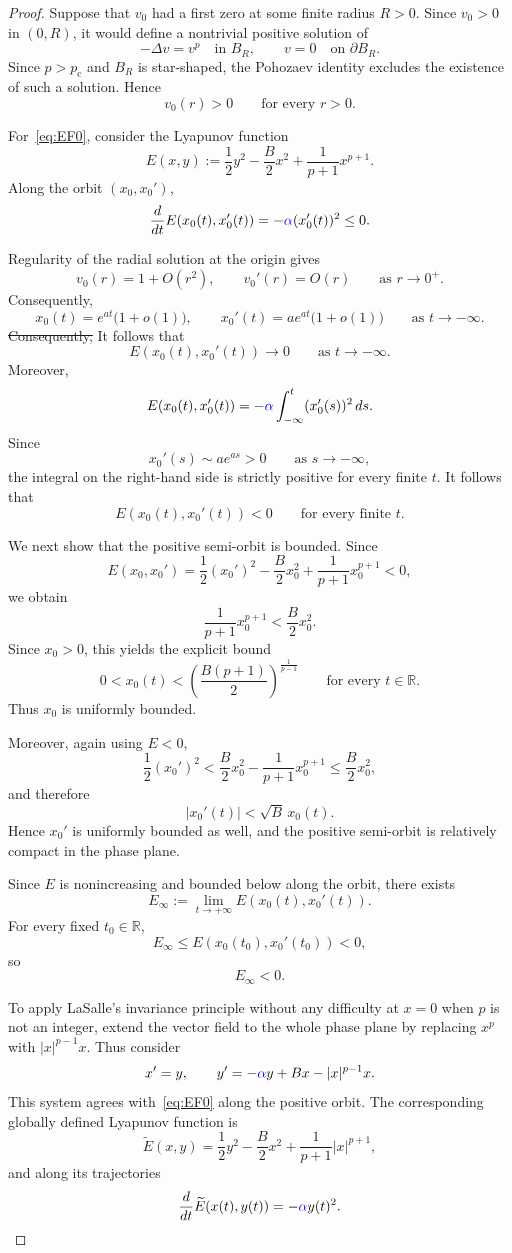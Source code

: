 \documentclass[11pt]{article}
\newcommand{\R}{\mathbb{R}}
\newcommand{\pc}{p_{\mathrm c}}
\newcommand{\add}[1]{{\color{blue}#1}}
\newcommand{\del}[1]{{\color{red}\sout{#1}}}
\newcommand{\oldrev}[1]{#1}
\newcommand{\damp}{\add{\alpha}}            %
\theoremstyle{definition}
\begin{document}
\begin{proof}
Suppose that $v_0$ had a first zero at some finite radius $R>0$.
Since $v_0>0$ in $(0,R)$, it would define a nontrivial positive
solution of
\[
-\Delta v=v^p
\quad\text{in }B_R,
\qquad
v=0
\quad\text{on }\partial B_R.
\]
Since \oldrev{$p>\pc$} and $B_R$ is star-shaped, the Pohozaev
identity excludes the existence of such a solution. Hence
\[
v_0(r)>0
\qquad
\text{for every }r>0.
\]

For~\eqref{eq:EF0}, consider the Lyapunov function
\[
E(x,y)
:=
\frac12y^2
-\frac{B}{2}x^2
+\frac1{p+1}x^{p+1}.
\]
Along the orbit $(x_0,x_0')$,
\[
\frac{d}{dt}E(x_0(t),x_0'(t))
=
-\damp(x_0'(t))^2
\leq0.
\]

\oldrev{Regularity of the radial solution at the origin gives
\[
v_0(r)=1+O(r^2),
\qquad
v_0'(r)=O(r)
\qquad
\text{as }r\to0^+.
\]
Consequently,}
\[
x_0(t)=e^{at}\bigl(1+o(1)\bigr),
\qquad
x_0'(t)=ae^{at}\bigl(1+o(1)\bigr)
\qquad
\text{as }t\to-\infty.
\]
\del{Consequently,} \add{It follows that}
\[
E(x_0(t),x_0'(t))\longrightarrow0
\qquad
\text{as }t\to-\infty.
\]
Moreover,
\[
E(x_0(t),x_0'(t))
=
-\damp\int_{-\infty}^{t}(x_0'(s))^2\,ds.
\]
\oldrev{Since
\[
x_0'(s)\sim ae^{as}>0
\qquad\text{as }s\to-\infty,
\]
the integral on the right-hand side is strictly positive for every
finite $t$.}
It follows that
\[
E(x_0(t),x_0'(t))<0
\qquad
\text{for every finite }t.
\]

We next show that the positive semi-orbit is bounded. Since
\[
E(x_0,x_0')
=
\frac12(x_0')^2
-\frac{B}{2}x_0^2
+\frac1{p+1}x_0^{p+1}
<0,
\]
we obtain
\[
\frac1{p+1}x_0^{p+1}
<
\frac{B}{2}x_0^2.
\]
\oldrev{Since $x_0>0$, this yields the explicit bound
\[
0<x_0(t)
<
\left(\frac{B(p+1)}{2}\right)^{\frac1{p-1}}
\qquad\text{for every }t\in\mathbb R.
\]}
Thus $x_0$ is uniformly bounded.

\oldrev{Moreover, again using $E<0$,
\[
\frac12(x_0')^2
<
\frac{B}{2}x_0^2
-\frac1{p+1}x_0^{p+1}
\leq
\frac{B}{2}x_0^2,
\]
and therefore
\[
|x_0'(t)|<\sqrt{B}\,x_0(t).
\]}
Hence $x_0'$ is uniformly bounded as well, and the positive
semi-orbit is \oldrev{relatively compact in the phase plane}.

Since $E$ is nonincreasing and bounded below along the orbit, there
exists
\[
E_\infty
:=
\lim_{t\to+\infty}E(x_0(t),x_0'(t)).
\]
For every fixed $t_0\in\R$,
\[
E_\infty\leq E(x_0(t_0),x_0'(t_0))<0,
\]
so
\[
E_\infty<0.
\]

\oldrev{To apply LaSalle's invariance principle without any
difficulty at $x=0$ when $p$ is not an integer, extend the vector
field to the whole phase plane by replacing $x^p$ with
$|x|^{p-1}x$. Thus consider
\[
x'=y,
\qquad
y'=-\damp y+Bx-|x|^{p-1}x.
\]
This system agrees with~\eqref{eq:EF0} along the positive orbit.
The corresponding globally defined Lyapunov function is
\[
\widetilde E(x,y)
=
\frac12y^2
-\frac{B}{2}x^2
+\frac1{p+1}|x|^{p+1},
\]
and along its trajectories
\[
\frac{d}{dt}\widetilde E(x(t),y(t))
=
-\damp y(t)^2.
\]}


\end{proof}
\end{document}
